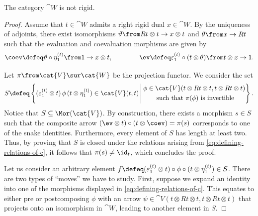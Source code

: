 \begin{theorem}\label{thm:props-of-c}
  The category \(\cat{W}\) is not rigid.
\end{theorem}
\begin{proof}
  Assume that \(t\in\cat{W}\) admits a right rigid dual \(x\in\cat{W}\).
  By the uniqueness of adjoints,
  there exist isomorphisms \(\vartheta \from Rt \otimes t \to x \otimes t\) and \(\theta \from x \to Rt\) such that the evaluation and coevaluation morphisms are given by
  \[
    \coev \defeq \vartheta \circ \eta^{(t)}_{1} \from 1 \to x \otimes t, \qquad \qquad
    \ev \defeq \varepsilon^{(t)}_{1} \circ (t\otimes \theta) \from t \otimes x \to 1.
  \]

  Let \(\pi \from  \cat{V} \sur \cat{W}\) be the projection functor.
  We consider the set
  \[
    S \defeq \left\{
      (\varepsilon^{(t)}_1 \otimes t)\,\phi\,(t \otimes \eta^{(t)}_1) \in \cat{V}(t,t) \,\middle\vert\, \begin{gathered}\phi \in \cat{V}(t\otimes Rt \otimes t, t \otimes Rt \otimes t) \\\text{ such that }  \pi(\phi) \text{ is invertible} \end{gathered} \right\}.
  \]
  Notice that \(S \subseteq \Mor(\cat{V})\).
  By construction, there exists a morphism \(s\in S\) such that the composite arrow
  \((\ev \otimes t) \circ (t\otimes \coev) = \pi(s)\)
  corresponds to one of the snake identities.
  Furthermore, every element of \(S\) has length at least two.
  Thus, by proving that \(S\) is closed under the relations arising from \cref{eq:defining-relations-of-c},
  it follows that \(\pi(s)\neq \id_t\), which concludes the proof.

  Let us consider an arbitrary element \(f \defeq (\varepsilon^{(t)}_1 \otimes t) \circ \phi \circ (t \otimes \eta^{(t)}_1) \in S\).
  There are two types of ``moves'' we have to study.
  First, suppose we expand an identity into one of the morphisms displayed in \cref{eq:defining-relations-of-c}.
  This equates to either pre or postcomposing \(\phi\) with an arrow \(\psi \in \cat{V}(t \otimes Rt \otimes t,t \otimes Rt \otimes t)\)
  that projects onto an isomorphism in \(\cat{W}\), leading to another element in \(S\).


\end{proof}

